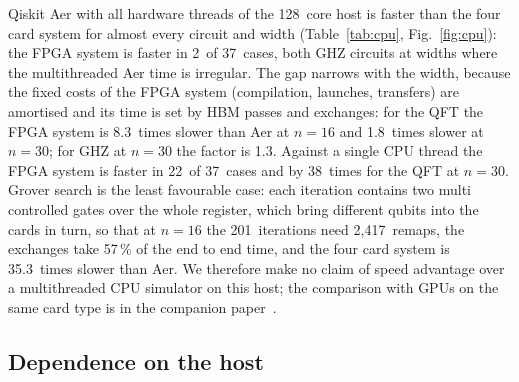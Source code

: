 \documentclass[pdflatex,sn-mathphys-num]{sn-jnl}
\newcommand{\NumCpuAerOneCases}{37}
\newcommand{\NumCpuAerOneOverQft}{38}
\newcommand{\NumCpuCases}{37}
\newcommand{\NumCpuFasterThanAerOne}{22}
\newcommand{\NumCpuFpgaFaster}{2}
\newcommand{\NumCpuRatioGhz}{1.3}
\newcommand{\NumCpuRatioGroverSixteen}{35.3}
\newcommand{\NumCpuRatioQft}{1.8}
\newcommand{\NumCpuRatioQftSixteen}{8.3}
\newcommand{\NumGroverSixteenExchPct}{57}
\newcommand{\NumGroverSixteenIters}{201}
\newcommand{\NumGroverSixteenRemaps}{2{,}417}
\newcommand{\NumHostCores}{128}
\theoremstyle{thmstyleone}
\theoremstyle{thmstylethree}
\begin{document}
Qiskit Aer with all hardware threads of the \NumHostCores~core host is faster than the four card system for
almost every circuit and width (Table~\ref{tab:cpu}, Fig.~\ref{fig:cpu}): the FPGA system is faster in
\NumCpuFpgaFaster~of \NumCpuCases~cases, both GHZ circuits at widths where the multithreaded Aer time is irregular.
The gap narrows with the width, because the fixed costs of the FPGA system (compilation, launches, transfers) are
amortised and its time is set by HBM passes and exchanges: for the QFT the FPGA system is \NumCpuRatioQftSixteen~times
slower than Aer at $n=16$ and \NumCpuRatioQft~times slower at $n=30$; for GHZ at $n=30$ the factor is \NumCpuRatioGhz.
Against a single CPU thread the FPGA system is faster in \NumCpuFasterThanAerOne~of \NumCpuAerOneCases~cases and by
\NumCpuAerOneOverQft~times for the QFT at $n=30$. Grover search is the least favourable case: each iteration contains two
multi controlled gates over the whole register, which bring different qubits into the cards in turn, so that at $n=16$
the \NumGroverSixteenIters~iterations need \NumGroverSixteenRemaps~remaps, the exchanges take \NumGroverSixteenExchPct\,\%
of the end to end time, and the four card system is \NumCpuRatioGroverSixteen~times slower than Aer. We therefore make no claim of speed advantage over a multithreaded CPU
simulator on this host; the comparison with GPUs on the same card type is in the companion paper~\cite{tiwari2026fpga30}.

\subsection{Dependence on the host}\label{subsec:res-host}
\end{document}
